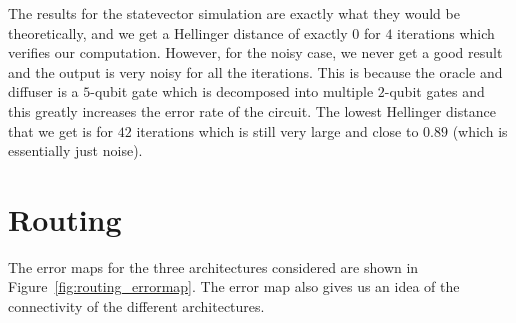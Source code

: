\documentclass[11pt]{article}
\begin{document}
The results for the statevector simulation are exactly what they would be theoretically, and we get a Hellinger distance of exactly $0$ for $4$ iterations which verifies our computation. However, for the noisy case, we never get a good result and the output is very noisy for all the iterations. This is because the oracle and diffuser is a $5$-qubit gate which is decomposed into multiple $2$-qubit gates and this greatly increases the error rate of the circuit. The lowest Hellinger distance that we get is for $42$ iterations which is still very large and close to $0.89$ (which is essentially just noise).


\section{Routing}
The error maps for the three architectures considered are shown in Figure~\ref{fig:routing_errormap}. The error map also gives us an idea of the connectivity of the different architectures.
\end{document}
